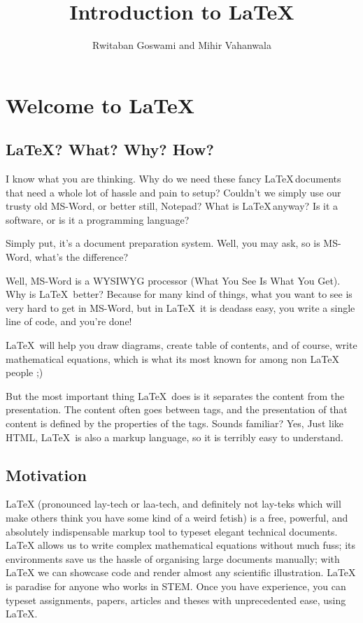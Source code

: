 \documentclass[12pt, letterpaper]{article}
\theoremstyle{remark}
\begin{document}
\title{Introduction to \LaTeX}
\author{Rwitaban Goswami and Mihir Vahanwala}
\maketitle
\tableofcontents
\newpage
\section{Welcome to \LaTeX}

\subsection{\LaTeX? What? Why? How?}
I know what you are thinking. Why do we need these fancy \LaTeX\,documents that need a whole lot of hassle and pain to setup? Couldn't we simply use our trusty old MS-Word, or better still, Notepad? What is \LaTeX\,anyway? Is it a software, or is it a programming language?

Simply put, it's a document preparation system. Well, you may ask, so is MS-Word, what's the difference? 

Well, MS-Word is a WYSIWYG processor (What You See Is What You Get). Why is \LaTeX\, better? Because for many kind of things, what you want to see is very hard to get in MS-Word, but in \LaTeX\, it is deadass easy, you write a single line of code, and you're done!

\LaTeX\, will help you draw diagrams, create table of contents, and of course, write mathematical equations, which is what its most known for among non \LaTeX\, people ;)

But the most important thing \LaTeX\, does is it separates the content from the presentation. The content often goes between tags, and the presentation of that content is defined by the properties of the tags. Sounds familiar? Yes, Just like HTML, \LaTeX\, is also a markup language, so it is terribly easy to understand.

\subsection{Motivation}
\LaTeX{} (pronounced lay-tech or laa-tech, and definitely not lay-teks which will make others think you have some kind of a weird fetish) is a free, powerful, and absolutely indispensable markup tool to typeset elegant technical documents. \LaTeX{} allows us to write complex mathematical equations without much fuss; its environments save us the hassle of organising large documents manually; with \LaTeX{} we can showcase code and render almost any scientific illustration. \LaTeX{} is paradise for anyone who works in STEM. Once you have experience, you can typeset assignments, papers, articles and theses with unprecedented ease, using \LaTeX.
\end{document}
